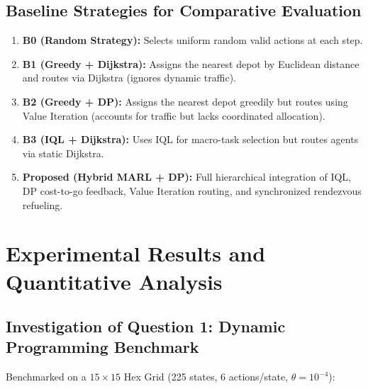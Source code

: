 \documentclass[11pt,a4paper]{article}
\begin{document}
\subsection{Baseline Strategies for Comparative Evaluation}
\begin{enumerate}
    \item \textbf{B0 (Random Strategy):} Selects uniform random valid actions at each step.
    \item \textbf{B1 (Greedy + Dijkstra):} Assigns the nearest depot by Euclidean distance and routes via Dijkstra (ignores dynamic traffic).
    \item \textbf{B2 (Greedy + DP):} Assigns the nearest depot greedily but routes using Value Iteration (accounts for traffic but lacks coordinated allocation).
    \item \textbf{B3 (IQL + Dijkstra):} Uses IQL for macro-task selection but routes agents via static Dijkstra.
    \item \textbf{Proposed (Hybrid MARL + DP):} Full hierarchical integration of IQL, DP cost-to-go feedback, Value Iteration routing, and synchronized rendezvous refueling.
\end{enumerate}

\section{Experimental Results and Quantitative Analysis}

\subsection{Investigation of Question 1: Dynamic Programming Benchmark}
Benchmarked on a $15 \times 15$ Hex Grid (225 states, 6 actions/state, $\theta = 10^{-4}$):

\begin{table}[htbp]
\centering
\small
\caption{Convergence and Runtime Benchmark: Value Iteration vs. Policy Iteration (EXP-001)}
\label{tab:dp_benchmark}
\end{table}
\end{document}
